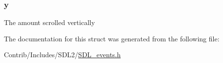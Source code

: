 \subsubsection[{\texorpdfstring{y}{y}}]{ y}\hypertarget{struct_s_d_l___mouse_wheel_event_ae6c55103b58b9a5b746ae4f6fbc9c901}{}\label{struct_s_d_l___mouse_wheel_event_ae6c55103b58b9a5b746ae4f6fbc9c901}
The amount scrolled vertically 

The documentation for this struct was generated from the following file\+:\begin{DoxyCompactItemize}
\item 
Contrib/\+Includes/\+S\+D\+L2/\hyperlink{_s_d_l__events_8h}{S\+D\+L\+\_\+events.\+h}\end{DoxyCompactItemize}
